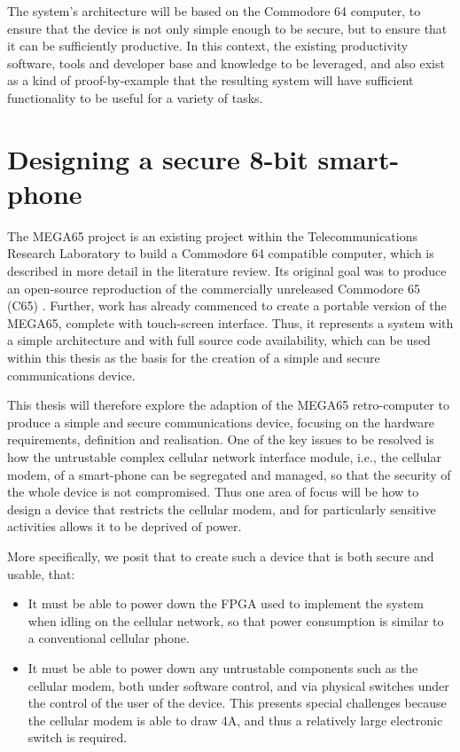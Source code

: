 The system’s architecture will be based on the Commodore 64 computer, to ensure that the device is not only simple enough to be secure, but to ensure that it can be sufficiently productive.
In this context, the existing productivity software, tools and developer base and knowledge to be leveraged, and also exist as a kind of proof-by-example that the resulting system will have sufficient functionality to be useful for a variety of tasks.


\section{Designing a secure 8-bit smart-phone}
\label{sec2}

The MEGA65 project is an existing project within the Telecommunications Research Laboratory to build a Commodore 64 compatible computer, which is described in more detail in the literature review.
Its original goal was to produce an open-source reproduction of the commercially unreleased Commodore 65 (C65) \citep{MEGA65MO64:online}.
Further, work has already commenced to create a portable version of the MEGA65, complete with touch-screen interface.
Thus, it represents a system with a simple architecture and with full source code availability, which can be used within this thesis as the basis for the creation of a simple and secure communications device.

This thesis will therefore explore the adaption of the MEGA65 retro-computer to produce a simple and secure communications device, focusing
on the hardware requirements, definition and realisation.
One of the key issues to be resolved is how the untrustable complex cellular network interface module, i.e., the cellular modem, of a smart-phone can be segregated and managed, so that the security of the whole device is not compromised.
Thus one area of focus will be how to design a device that restricts the cellular modem, and for particularly sensitive activities allows it to be deprived of power.

More specifically, we posit that to create such a device that is both secure and usable, that:
\begin{itemize}
	\item It must be able to power down the FPGA used to implement the system when idling on the cellular network, so that power consumption is similar to a conventional cellular phone.
	\item It must be able to power down any untrustable components such as the cellular modem, both under software control, and via physical switches under the control of the user of the device. This presents special challenges because the cellular modem is able to draw 4A, and thus a relatively large electronic switch is required.
\end{itemize}

